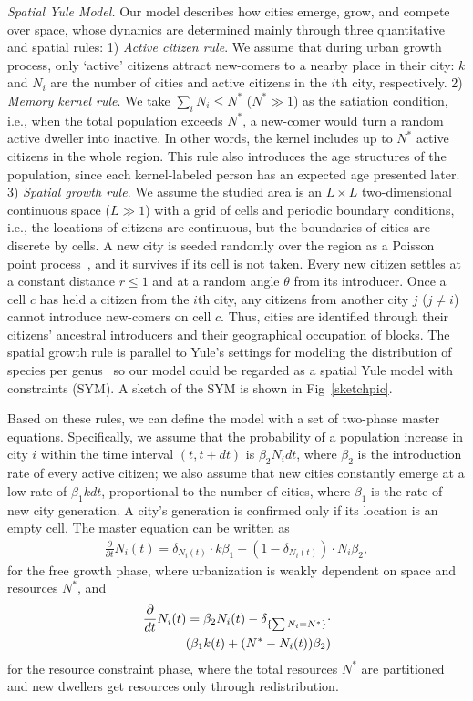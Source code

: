 \documentclass[reprint,unsortedaddress,amsmath,amssymb,aps,prl,showkeys]{revtex4-2}
\begin{document}
\textit{Spatial Yule Model.} Our model describes how cities emerge, grow, and compete over space, whose dynamics are determined mainly through three quantitative and spatial rules: 1) \textit{Active citizen rule}. We assume that during urban growth process, only `active' citizens attract new-comers to a nearby place in their city: $k$ and $N_i$ are the number of cities and active citizens in the $i$th city, respectively. 2) \textit{Memory kernel rule}. We take $\sum_{i} N_i \le N^*$ ($N^* \gg 1$) as the satiation condition, i.e., when the total population exceeds $N^*$, a new-comer would turn a random active dweller into inactive. In other words, the kernel includes up to $N^*$ active citizens in the whole region. This rule also introduces the age structures of the population, since each kernel-labeled person has an expected age presented later. 3) \emph{Spatial growth rule}. We assume the studied area is an $L\times L$ two-dimensional continuous space ($L\gg 1$) with a grid of cells and periodic boundary conditions, i.e., the locations of citizens are continuous, but the boundaries of cities are discrete by cells. A new city is seeded randomly over the region as a Poisson point process~\cite{miles1970homogeneous}, and it survives if its cell is not taken. Every new citizen settles at a constant distance $r\le 1$ and at a random angle $\theta$ from its introducer. Once a cell $c$ has held a citizen from the $i$th city, any citizens from another city $j$ ($j\ne i$) cannot introduce new-comers on cell $c$. Thus, cities are identified through their citizens' ancestral introducers and their geographical occupation of blocks. The spatial growth rule is parallel to Yule's settings for modeling the distribution of species per genus~\cite{yule1925ii} so our model could be regarded as a spatial Yule model with constraints (SYM). A sketch of the SYM is shown in Fig~\ref{sketchpic}.

Based on these rules, we can define the model with a set of two-phase master equations. Specifically, we assume that the probability of a population increase in city $i$ within the time interval $(t,t+dt)$ is $\beta_2N_idt$, where $\beta_2$ is the introduction rate of every active citizen; we also assume that new cities constantly emerge at a low rate of $\beta_1kdt$, proportional to the number of cities, where $\beta_1$ is the rate of new city generation. A city's generation is confirmed only if its location is an empty cell. The master equation can be written as \begin{align}\frac{\partial}{\partial t}N_i(t) =  \delta_{N_i(t)}\cdot k\beta_1+ (1-\delta_{N_i(t)})\cdot N_i\beta_2, \end{align} for the free growth phase, where urbanization is weakly dependent on space and resources $N^*$,
and \begin{align}
\frac{\partial}{dt} N_i(t) = \beta_2 N_i(t) -\delta_{\{\sum N_i = N^*\}}\cdot\notag \\ \left(\beta_1k(t) + (N^*-N_i(t))\beta_2 \right)
\end{align}
for the resource constraint phase, where the total resources $N^*$ are partitioned and new dwellers get resources only through redistribution. 
\end{document}
